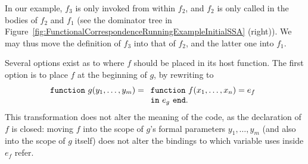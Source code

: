 In our example, $f_3$ is only invoked from within $f_2$, and $f_2$ is
only called in the bodies of $f_2$ and $f_1$ (see the dominator tree
in Figure~\ref{fig:FunctionalCorrespondenceRunningExampleInitialSSA}
(right)).  We may thus move the definition of $f_3$ into that of
$f_2$, and the latter one into $f_1$.

Several options exist as to where $f$ should be placed in its host
function. The first option is to place $f$ at the beginning of $g$,
by rewriting to 
$$\texttt{function}\ g(y_1,\ldots,y_m) =
\begin{array}[t]{l} 
  \texttt{function}\ f(x_1,\ldots,x_n) = e_f\\
  \texttt{in}\ e_g\ \texttt{end}.
\end{array}
$$ This transformation does not alter the meaning of the code, as the
declaration of $f$ is closed: moving $f$ into the scope of $g$'s
formal parameters $y_1,\ldots,y_m$ (and also into the scope of $g$
itself) does not alter the bindings to which variable uses inside
$e_f$ refer.

